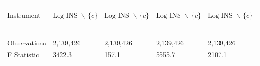 \documentclass[11pt,oneside,reqno,xcolor=dvipsnames]{article} %
\begin{document}
\begin{appendix}
\begin{refsection}
\begin{landscape}
\begin{table}[!ht]
{\begin{threeparttable}
\begin{tabular}{|C{4cm}|C{2.7cm}C{2.7cm}C{2.7cm}C{2.7cm}|}
&&&&  \\[0.2cm] \hdashline
&&&& \\[-0.2cm]
Instrument  & $ \overline{\text{Log}\,\,\text{INS}} \,\,\backslash\, \{c\} $ & $ \overline{\text{Log}\,\,\text{INS}} \,\,\backslash\, \{c\} $ & $ \overline{\text{Log}\,\,\text{INS}} \,\,\backslash\, \{c\} $ & $ \overline{\text{Log}\,\,\text{INS}} \,\,\backslash\, \{c\} $  \\
  &  &   &  &   \\
&&&& \\
  &  &  &  &  \\
&&&& \\
&&&& \\[0.2cm] \hdashline
&&&& \\[-0.2cm]
Observations &  2,139,426       & 2,139,426       & 2,139,426       & 2,139,426         \\[0.2cm]
F Statistic & 3422.3 & 157.1 & 5555.7 & 2107.1 \\[0.2cm]  \hline \hline
\end{tabular}
\begin{tablenotes}

\end{tablenotes}
\end{threeparttable}}
\end{table}
\end{landscape}
\end{refsection}
\end{appendix}
\end{document}
